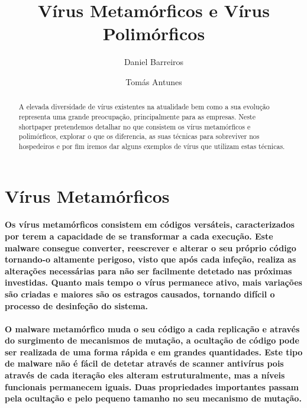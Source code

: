 \documentclass[runningheads]{llncs}
\begin{document}
%
\title{Vírus Metamórficos e Vírus Polimórficos}
%
%
\author{Daniel Barreiros \and
Tomás Antunes }
%
%
%
\maketitle              %
%
\begin{abstract}

A elevada diversidade de vírus existentes na atualidade bem como a sua evolução representa uma grande preocupação, principalmente para as empresas.
Neste shortpaper pretendemos detalhar no que consistem os vírus metamórficos e polimórficos, explorar o que os diferencia, as suas técnicas para sobreviver nos hospedeiros e por fim iremos dar alguns exemplos de vírus que utilizam estas técnicas.

\end{abstract}
%

\section{Vírus Metamórficos}

\paragraph{Os vírus metamórficos consistem em códigos versáteis, caracterizados por terem a capacidade de se transformar a cada execução. Este malware consegue converter, reescrever e alterar o seu próprio código tornando-o altamente perigoso, visto que após cada infeção, realiza as alterações necessárias para não ser facilmente detetado nas próximas investidas. Quanto mais tempo o vírus permanece ativo, mais variações são criadas e maiores são os estragos causados, tornando difícil o processo de desinfeção do sistema.
}

\paragraph{O malware metamórfico muda o seu código a cada replicação e através do surgimento de mecanismos de mutação, a ocultação de código  pode ser realizada de uma forma rápida e em grandes quantidades. Este tipo de malware não é fácil de detetar através de scanner antivírus pois através de cada iteração eles alteram estruturalmente, mas a níveis funcionais permanecem iguais. Duas propriedades importantes passam pela ocultação e pelo pequeno tamanho no seu mecanismo de mutação.}\cite{3}\cite{1}
\end{document}
